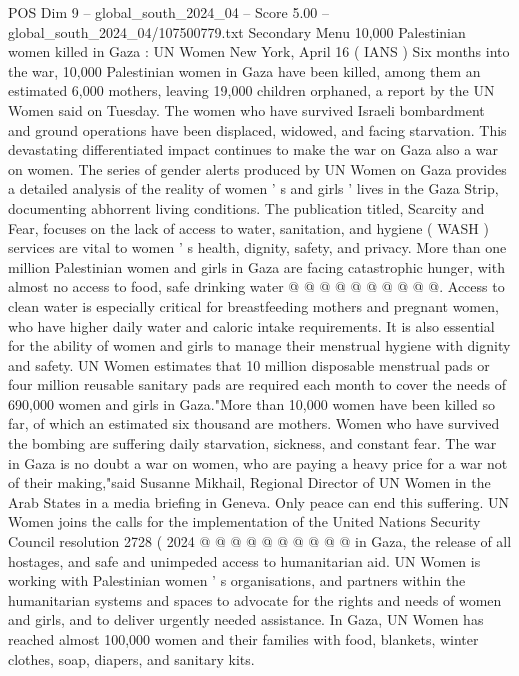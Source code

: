 \begin{textsample}{POS Dim 9 – global\_south\_2024\_04 – Score 5.00 – global\_south\_2024\_04/107500779.txt}  \label{ex:f9_pos_075}
Secondary Menu 10,000 Palestinian women killed in Gaza : UN Women New York, April 16 ( IANS ) Six months into the war, 10,000 Palestinian women in Gaza have been killed, among them an estimated 6,000 mothers, leaving 19,000 children orphaned, a report by the UN Women said on Tuesday.
The women who have survived Israeli bombardment and ground operations have been displaced, widowed, and facing starvation.
This devastating differentiated impact continues to make the war on Gaza also a war on women.
The series of gender alerts produced by UN Women on Gaza provides a detailed analysis of the reality of women ' s and girls ' lives in the Gaza Strip, documenting abhorrent living conditions.
The publication titled, Scarcity and Fear, focuses on the lack of access to water, sanitation, and hygiene ( WASH ) services are vital to women ' s health, dignity, safety, and privacy.
More than one million Palestinian women and girls in Gaza are facing catastrophic hunger, with almost no access to food, safe drinking water @ @ @ @ @ @ @ @ @ @.
Access to clean water is especially critical for breastfeeding mothers and pregnant women, who have higher daily water and caloric intake requirements.
It is also essential for the ability of women and girls to manage their menstrual hygiene with dignity and safety.
UN Women estimates that 10 million disposable menstrual pads or four million reusable sanitary pads are required each month to cover the needs of 690,000 women and girls in Gaza."More than 10,000 women have been killed so far, of which an estimated six thousand are mothers.
Women who have survived the bombing are suffering daily starvation, sickness, and constant fear.
The war in Gaza is no doubt a war on women, who are paying a heavy price for a war not of their making,"said Susanne Mikhail, Regional Director of UN Women in the Arab States in a media briefing in Geneva.
Only peace can end this suffering.
UN Women joins the calls for the implementation of the United Nations Security Council resolution 2728 ( 2024 @ @ @ @ @ @ @ @ @ @ in Gaza, the release of all hostages, and safe and unimpeded access to humanitarian aid.
UN Women is working with Palestinian women ' s organisations, and partners within the humanitarian systems and spaces to advocate for the rights and needs of women and girls, and to deliver urgently needed assistance.
In Gaza, UN Women has reached almost 100,000 women and their families with food, blankets, winter clothes, soap, diapers, and sanitary kits.

\end{textsample}
